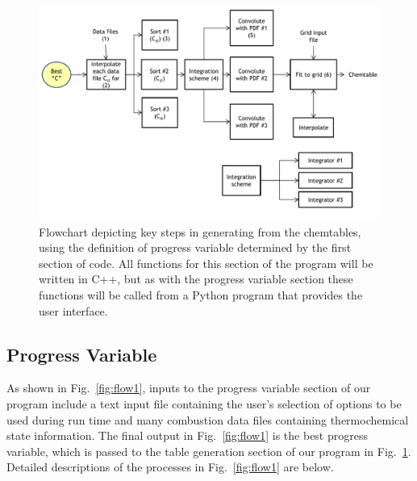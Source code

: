 \documentclass[11pt]{article}
\begin{document}
\begin{figure} [h]
\centering
\includegraphics[width=\textwidth]{diagram_2_v4.pdf}
\caption{\label{fig:flow2}Flowchart depicting key steps in generating from the chemtables, using the definition of progress variable determined by the first section of code. All functions for this section of the program will be written in C++, but as with the progress variable section these functions will be called from a Python program that provides the user interface.}
\end{figure}

\subsection{Progress Variable}
As shown in Fig.~\ref{fig:flow1}, inputs to the progress variable section of our program include a text input file containing the user’s selection of options to be used during run time and many combustion data files containing thermochemical state information. The final output in Fig.~\ref{fig:flow1} is the best progress variable, which is passed to the table generation section of our program in Fig.~\ref{fig:flow2}. Detailed descriptions of the processes in Fig.~\ref{fig:flow1} are below.
\end{document}
